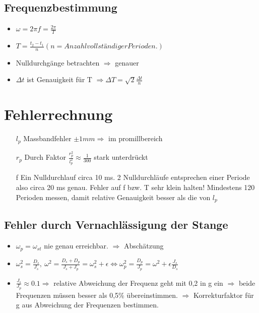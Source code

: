 \documentclass[a4paper,12pt]{scrartcl}
\begin{document}
\subsection{Frequenzbestimmung}
\begin{itemize}
\item $\omega=2 \pi f= \frac{2\pi}{T}$
\item $T=\frac{t_2-t_1}{n} (n=Anzahl vollständiger Perioden.)$
\item Nulldurchgänge betrachten $\Rightarrow$ genauer
\item $\Delta t$ ist Genauigkeit für T $\Rightarrow \Delta T=\sqrt{2}\frac{\Delta t}{n}$
\end{itemize}
\section{Fehlerrechnung}
\begin{itemize}
\item[$l_p$] Massbandfehler $\pm 1mm \Rightarrow$ im promillbereich
\item[$r_p$] Durch Faktor $\frac{r_p^2}{l_p^2}\approx\frac{1}{300}$ stark unterdrückt
\item[f] Ein Nulldurchlauf circa 10 ms. 2 Nulldurchläufe entsprechen einer Periode also circa 20 ms genau. Fehler auf f bzw. T sehr klein halten! Mindestens 120 Perioden messen, damit relative Genauigkeit besser als die von $l_p$
\end{itemize}
\subsection{Fehler durch Vernachlässigung der Stange}
\begin{itemize}
\item $\omega_p=\omega_{st}$ nie genau erreichbar. $\Rightarrow$ Abschätzung
\item $ \omega_s^2=\frac{D_s}{J_s},~ \omega^2=\frac{D_s+D_p}{J_s+J_p}=\omega_s^2+\epsilon \Leftrightarrow \omega_p^2=\frac{D_p}{J_p}=\omega^2+\epsilon\frac{J_s}{D_s}$
\item $\frac{J_s}{J_p}\approx0.1 \Rightarrow$ relative Abweichung der Frequenz geht mit 0,2 in g ein $\Rightarrow$ beide Frequenzen müssen besser als 0,5\% übereinstimmen. $\Rightarrow$ Korrekturfaktor für g aus Abweichung der Frequenzen bestimmen.
\end{itemize}
\end{document}
